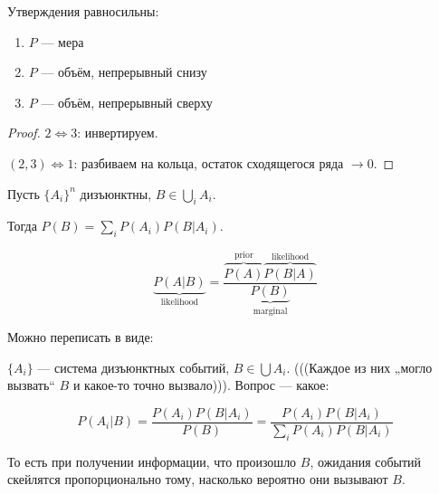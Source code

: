 \documentclass[12pt, a4paper, oneside]{article}
\begin{document}

\begin{theorem}
    Утверждения равносильны:

    \begin{enumerate}
        \item $P$ — мера
        \item $P$ — объём, непрерывный снизу
        \item $P$ — объём, непрерывный сверху
    \end{enumerate}
\end{theorem}

\begin{proof}
    $2 \Leftrightarrow 3$: инвертируем.

    $(2, 3) \Leftrightarrow 1$: разбиваем на кольца, остаток сходящегося ряда $→ 0$. 
\end{proof}

\begin{theorem}

    Пусть $\{A_i\}^n$ дизъюнктны, $B \in \bigcup_i A_i$.

    Тогда $P(B) = \sum_i P(A_i)P(B | A_i)$.
\end{theorem}



\begin{theorem}
    [Байеса]

    \begin{equation}
        \underbrace{P(A | B)}_{\mathrm{likelihood}} = \frac{\overbrace{P(A)}^{\mathrm{prior}} \overbrace{P(B | A)}^{\mathrm{likelihood}}}{\underbrace{P(B)}_{\mathrm{marginal}}}
    \end{equation}
\end{theorem}

Можно переписать в виде:

$\{A_i\}$ — система дизъюнктных событий, $B \in \bigcup A_i$.
(((Каждое из них „могло вызвать“ $B$ и какое-то точно вызвало))).
Вопрос — какое:

\begin{equation}
    P(A_i | B) = \frac{P(A_i)P(B | A_i)}{P(B)} = \frac{P(A_i)P(B | A_i)}{\sum_i P(A_i)P(B | A_i)}
\end{equation}

То есть при получении информации, что произошло $B$, ожидания событий скейлятся пропорционально тому,
насколько вероятно они вызывают $B$.
\end{document}

